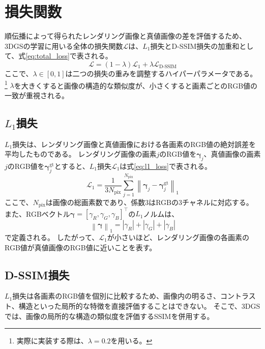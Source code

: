 \documentclass[dvipdfmx]{jlreq}
\newcommand{\LDSSIM}{\mathcal{L}_{\mathrm{D\text{-}SSIM}}}
\begin{document}
\section{損失関数}
順伝播によって得られたレンダリング画像と真値画像の差を評価するため、3DGSの学習に用いる全体の損失関数$\mathcal{L}$は、$L_1$損失とD-SSIM損失の加重和として、式\eqref{eq:total_loss}で表される。
\begin{equation}
    \mathcal{L} = (1-\lambda)\mathcal{L}_1 + \lambda\LDSSIM
    \label{eq:total_loss}
\end{equation}
ここで、$\lambda\in[0,1]$は二つの損失の重みを調整するハイパーパラメータである。
\footnote{実際に実装する際は、$\lambda=0.2$を用いる。}
$\lambda$を大きくすると画像の構造的な類似度が、小さくすると画素ごとのRGB値の一致が重視される。

\subsection{$L_1$損失}
$L_1$損失は、レンダリング画像と真値画像における各画素のRGB値の絶対誤差を平均したものである。
レンダリング画像の画素$j$のRGB値を$\bm{\gamma}_j$、真値画像の画素$j$のRGB値を$\bm{\gamma}_j^{\mathrm{gt}}$とすると、$L_1$損失$\mathcal{L}_1$は式\eqref{eq:l1_loss}で表される。
\begin{equation}
    \mathcal{L}_1 = \frac{1}{3N_{\mathrm{pix}}}\sum_{j=1}^{N_{\mathrm{pix}}}\left\lVert\bm{\gamma}_j-\bm{\gamma}_j^{\mathrm{gt}}\right\rVert_1
    \label{eq:l1_loss}
\end{equation}
ここで、$N_{\mathrm{pix}}$は画像の総画素数であり、係数$3$はRGBの3チャネルに対応する。
また、RGBベクトル$\bm{\gamma}=[\gamma_R,\gamma_G,\gamma_B]^{\top}$の$L_1$ノルムは、
\begin{equation}
    \left\lVert\bm{\gamma}\right\rVert_1 = |\gamma_R|+|\gamma_G|+|\gamma_B|
    \label{eq:l1_norm}
\end{equation}
で定義される。
したがって、$\mathcal{L}_1$が小さいほど、レンダリング画像の各画素のRGB値が真値画像のRGB値に近いことを表す。

\subsection{D-SSIM損失}
$L_1$損失は各画素のRGB値を個別に比較するため、画像内の明るさ、コントラスト、構造といった局所的な特徴を直接評価することはできない。
そこで、3DGSでは、画像の局所的な構造の類似度を評価するSSIMを併用する。
\end{document}
